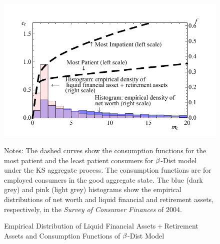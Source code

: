 \documentclass[12pt,titlepage]{econtex}
\newcommand{\tablenotessize}[1]{\footnotesize{#1}} %
\begin{document}
%     


\begin{figure}
  \caption{Empirical Distribution of Liquid Financial
    Assets${}+{}$Retirement Assets and Consumption Functions of
    $\beta$-Dist Model}
  \label{CFuncDistSevenAndHistNetWorthLiqFinPlsRetPlot}
  \begin{center}
    \includegraphics[scale=1.25]{./Figures/CFuncDistSevenAndHistNetWorthLiqFinPlsRetPlot}
  \end{center}
  \footnotesize Notes: The dashed curves show the consumption functions
  for the most patient and the least patient consumers for
  $\beta$-Dist model under the KS aggregate process. The consumption functions are for employed consumers in the good aggregate state. The blue (dark grey) and pink (light grey)
  histograms show the empirical distributions of net worth and liquid
  financial and retirement assets, respectively, in the \emph{Survey of
    Consumer Finances} of 2004.
\end{figure}
\end{document}
